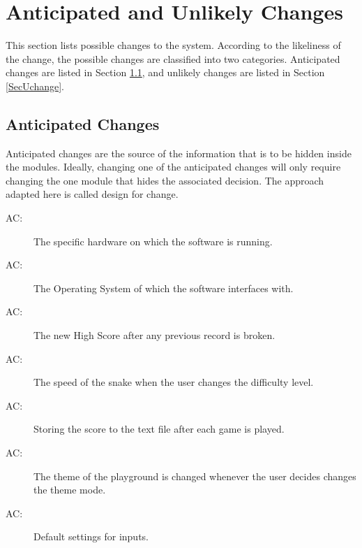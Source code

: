 \documentclass[12pt, titlepage]{article}
\newcounter{acnum}
\newcommand{\actheacnum}{AC\theacnum}
\begin{document}

\section{Anticipated and Unlikely Changes} \label{SecChange}

This section lists possible changes to the system. According to the likeliness
of the change, the possible changes are classified into two
categories. Anticipated changes are listed in Section \ref{SecAchange}, and
unlikely changes are listed in Section \ref{SecUchange}.

\subsection{Anticipated Changes} \label{SecAchange}

Anticipated changes are the source of the information that is to be hidden
inside the modules. Ideally, changing one of the anticipated changes will only
require changing the one module that hides the associated decision. The approach
adapted here is called design for
change.

\begin{description}
\item[ \actheacnum \label{acHardware}:] The specific
  hardware on which the software is running.
\item[ \actheacnum \label{acInput}:] The Operating System of which the software interfaces with.
\item[ \actheacnum \label{acInput}:] The new High Score after any previous record is broken.
\item[ \actheacnum \label{acInput}:] The speed of the snake when the user changes the difficulty level.
\item[ \actheacnum \label{acInput}:] Storing the score to the text file after each game is played.
\item[ \actheacnum \label{acInput}:] The theme of the playground is changed whenever the user decides changes the theme mode.
\item[ \actheacnum \label{acInput}:]Default settings for inputs.

\end{description}
\end{document}
